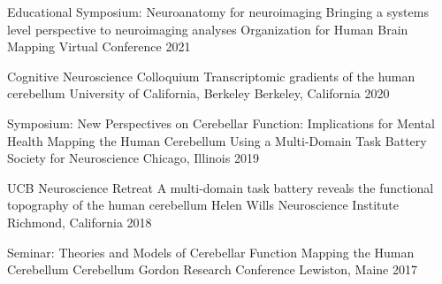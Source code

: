 

\begin{cventries}

  \cventry
    {Educational Symposium: Neuroanatomy for neuroimaging} %
    {Bringing a systems level perspective to neuroimaging analyses} %
    {Organization for Human Brain Mapping} %
    {Virtual Conference} %
    {2021} %
    
  \cventry
    {Cognitive Neuroscience Colloquium} %
    {Transcriptomic gradients of the human cerebellum} %
    {University of California, Berkeley} %
    {Berkeley, California} %
    {2020} %

  \cventry
    {Symposium: New Perspectives on Cerebellar Function: Implications for Mental Health} %
    {Mapping the Human Cerebellum Using a Multi-Domain Task Battery} %
    {Society for Neuroscience} %
    {Chicago, Illinois} %
    {2019} %
    
  \cventry
    {UCB Neuroscience Retreat} %
    {A multi-domain task battery reveals the functional topography of the human cerebellum} %
    {Helen Wills Neuroscience Institute}
    {Richmond, California} %
    {2018} %
    
  \cventry
    {Seminar: Theories and Models of Cerebellar Function} %
    {Mapping the Human Cerebellum} %
    {Cerebellum Gordon Research Conference} %
    {Lewiston, Maine} %
    {2017} %
   
\end{cventries}
